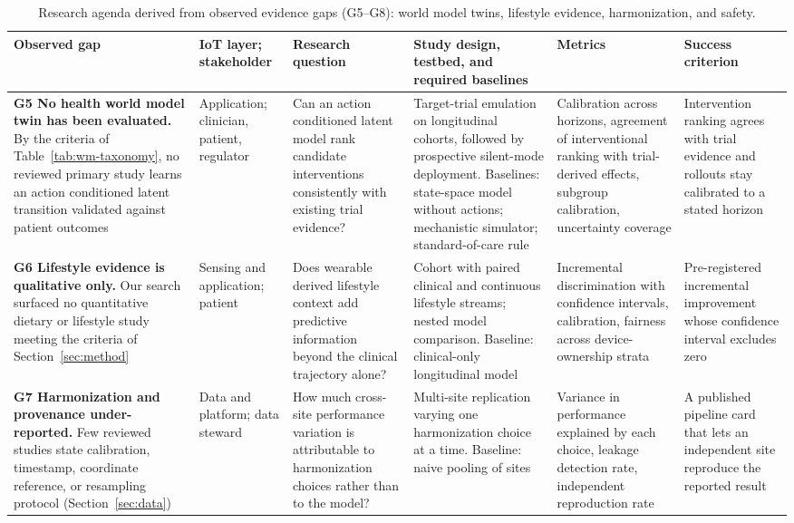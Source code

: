 \documentclass[journal]{IEEEtran}
\newif\ifsubmission
\begin{document}
\ifsubmission\else
\begin{table}[p]
\centering
\caption{Research agenda derived from observed evidence gaps (G5--G8): world model twins, lifestyle evidence, harmonization, and safety.}
\label{tab:agenda-b}
\scriptsize
\setlength{\tabcolsep}{3pt}
\renewcommand{\arraystretch}{1.12}
\begin{tabularx}{\textwidth}{>{\raggedright\arraybackslash}p{3.4cm} >{\raggedright\arraybackslash}p{1.9cm} >{\raggedright\arraybackslash}X >{\raggedright\arraybackslash}X >{\raggedright\arraybackslash}p{2.9cm} >{\raggedright\arraybackslash}p{3.0cm}}
\toprule
\textbf{Observed gap} & \textbf{IoT layer; stakeholder} & \textbf{Research question} & \textbf{Study design, testbed, and required baselines} & \textbf{Metrics} & \textbf{Success criterion} \\
\midrule
\textbf{G5 No health world model twin has been evaluated.} By the criteria of Table~\ref{tab:wm-taxonomy}, no reviewed primary study learns an action conditioned latent transition validated against patient outcomes & Application; clinician, patient, regulator & Can an action conditioned latent model rank candidate interventions consistently with existing trial evidence? & Target-trial emulation on longitudinal cohorts, followed by prospective silent-mode deployment. Baselines: state-space model without actions; mechanistic simulator; standard-of-care rule & Calibration across horizons, agreement of interventional ranking with trial-derived effects, subgroup calibration, uncertainty coverage & Intervention ranking agrees with trial evidence and rollouts stay calibrated to a stated horizon \\
\addlinespace[3pt]
\textbf{G6 Lifestyle evidence is qualitative only.} Our search surfaced no quantitative dietary or lifestyle study meeting the criteria of Section~\ref{sec:method} & Sensing and application; patient & Does wearable derived lifestyle context add predictive information beyond the clinical trajectory alone? & Cohort with paired clinical and continuous lifestyle streams; nested model comparison. Baseline: clinical-only longitudinal model & Incremental discrimination with confidence intervals, calibration, fairness across device-ownership strata & Pre-registered incremental improvement whose confidence interval excludes zero \\
\addlinespace[3pt]
\textbf{G7 Harmonization and provenance under-reported.} Few reviewed studies state calibration, timestamp, coordinate reference, or resampling protocol (Section~\ref{sec:data}) & Data and platform; data steward & How much cross-site performance variation is attributable to harmonization choices rather than to the model? & Multi-site replication varying one harmonization choice at a time. Baseline: naive pooling of sites & Variance in performance explained by each choice, leakage detection rate, independent reproduction rate & A published pipeline card that lets an independent site reproduce the reported result \\

\end{tabularx}
\end{table}
\end{document}
